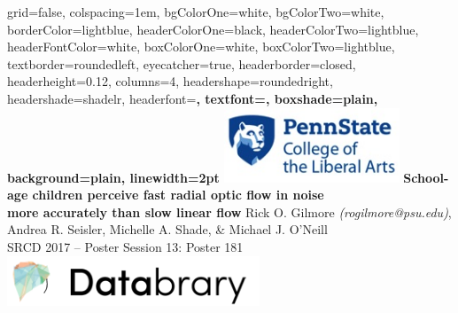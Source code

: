 \documentclass[landscape,final,paperwidth=60in,paperheight=40in,fontscale=0.285]{baposter}
\begin{document}



\begin{poster}%
  {
  grid=false,
  colspacing=1em,
  bgColorOne=white,
  bgColorTwo=white,
  borderColor=lightblue,
  headerColorOne=black,
  headerColorTwo=lightblue,
  headerFontColor=white,
  boxColorOne=white,
  boxColorTwo=lightblue,
  textborder=roundedleft,
  eyecatcher=true,
  headerborder=closed,
  headerheight=0.12\textheight,
  columns=4, %
  headershape=roundedright,
  headershade=shadelr,
  headerfont=\Large\bf\textsc, %
  textfont={\setlength{\parindent}{1.5em}},
  boxshade=plain,
  background=plain,
  linewidth=2pt
  }
  {\includegraphics[height=6em]{penn_state_cla_logo_new_210-89.jpg}}
  {\bf{School-age children perceive fast radial optic flow in noise\\more accurately than slow linear flow} 
  \vspace{0.3em}}
  {Rick O. Gilmore \emph{(rogilmore@psu.edu)}, Andrea R. Seisler, Michelle A. Shade, \& Michael J. O'Neill\\ \vspace{0.3em}
  SRCD 2017 -- Poster Session 13: Poster 181}
 {\includegraphics[height=4em]{databrary.png}}


\end{poster}
\end{document}
